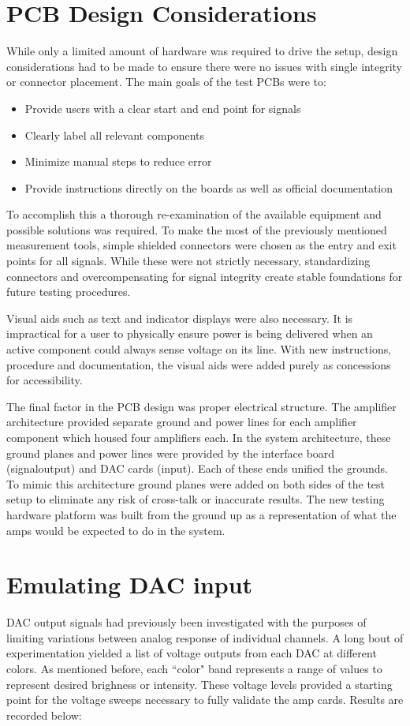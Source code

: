 \section{PCB Design Considerations}
While only a limited amount of hardware was required to drive the setup, design considerations had to be made to ensure there were no issues with single integrity or connector placement. The main goals of the test PCBs were to:
\begin{itemize}
	\item Provide users with a clear start and end point for signals
	\item Clearly label all relevant components
	\item Minimize manual steps to reduce error
	\item Provide instructions directly on the boards as well as official documentation
\end{itemize}
To accomplish this a thorough re-examination of the available equipment and possible solutions was required. To make the most of the previously mentioned measurement tools, simple shielded connectors were chosen as the entry and exit points for all signals. While these were not strictly necessary, standardizing connectors and overcompensating for signal integrity create stable foundations for future testing procedures. \par
Visual aids such as text and indicator displays were also necessary. It is impractical for a user to physically ensure power is being delivered when an active component could always sense voltage on its line. With new instructions, procedure and documentation, the visual aids were added purely as concessions for accessibility.\par
The final factor in the PCB design was proper electrical structure. The amplifier architecture provided separate ground and power lines for each amplifier component which housed four amplifiers each. In the system architecture, these ground planes and power lines were provided by the interface board (signaloutput) and DAC cards (input). Each of these ends unified the grounds. To mimic this architecture ground planes were added on both sides of the test setup to eliminate any risk of cross-talk or inaccurate results. The new testing hardware platform was built from the ground up as a representation of what the amps would be expected to do in the system.
\section{Emulating DAC input}
DAC output signals had previously been investigated with the purposes of limiting variations between analog response of individual channels. A long bout of experimentation yielded a list of voltage outputs from each DAC at different colors. As mentioned before, each ``color" band represents a range of values to represent desired brighness or intensity. These voltage levels provided a starting point for the voltage sweeps necessary to fully validate the amp cards. Results are recorded below:

